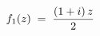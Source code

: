 \documentclass[preview]{standalone}
\begin{document}
\begin{align*}
\special{dvisvgm:raw <g id='unique000'>}f_1(z) \;=\; \dfrac{(1+i)\,z}{2}\special{dvisvgm:raw </g>}
\end{align*}
\end{document}
